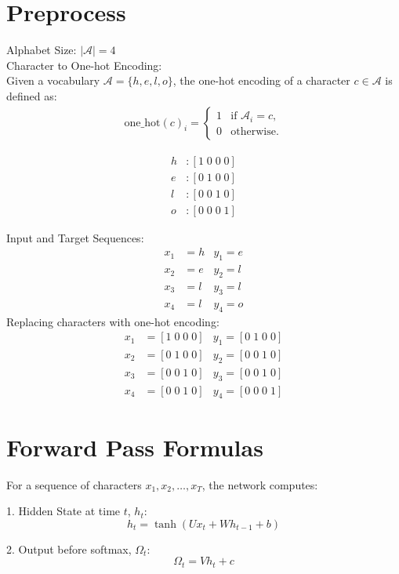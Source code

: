 \documentclass{article}
\begin{document}
\section{Preprocess}
Alphabet Size: $|\mathcal{A}| = 4$  \\
Character to One-hot Encoding: \\
Given a vocabulary $\mathcal{A} = \{h, e, l, o\}$, the one-hot encoding of a character $c \in \mathcal{A}$ is defined as:
\begin{align*}
\text{one\_hot}(c)_i = 
\begin{cases} 
1 & \text{if } \mathcal{A}_i = c, \\
0 & \text{otherwise}.
\end{cases}
\end{align*}

\begin{align*}
    h & : [1\; 0\; 0\; 0] \\
    e & : [0\; 1\; 0\; 0] \\
    l & : [0\; 0\; 1\; 0] \\
    o & : [0\; 0\; 0\; 1]
\end{align*}

Input and Target Sequences:
\begin{align*}
    x_1 & = h  &y_1 = e \\
    x_2 & = e  &y_2 = l \\
    x_3& = l  &y_3 = l \\
    x_4 & = l  &y_4 = o
\end{align*}
Replacing characters with one-hot encoding:
\begin{align*}
    x_1 & = [1\; 0\; 0\; 0]  &y_1 = [0\; 1\; 0\; 0] \\
    x_2 & = [0\; 1\; 0\; 0]  &y_2 = [0\; 0\; 1\; 0] \\
    x_3& = [0\; 0\; 1\; 0]  &y_3 = [0\; 0\; 1\; 0] \\
    x_4 & = [0\; 0\; 1\; 0]  &y_4 = [0\; 0\; 0\; 1]
\end{align*}

\section{Forward Pass Formulas}

For a sequence of characters $x_1, x_2, \ldots, x_T$, the network computes:

1. Hidden State at time $t$, $h_t$:
$$
h_t = \tanh(Ux_t + Wh_{t-1} + b)
$$

2. Output before softmax, $\Omega_t$:
$$
\Omega_t = Vh_t + c
$$
\end{document}
